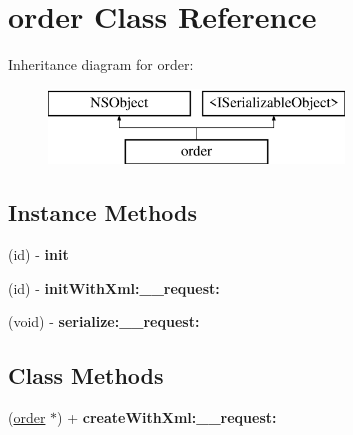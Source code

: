 \hypertarget{interfaceorder}{}\section{order Class Reference}
\label{interfaceorder}
Inheritance diagram for order\+:\begin{figure}[H]
\begin{center}
\leavevmode
\includegraphics[height=2.000000cm]{interfaceorder}
\end{center}
\end{figure}
\subsection*{Instance Methods}
\begin{DoxyCompactItemize}
\item 
\hypertarget{interfaceorder_a2e10f51ea8ce4735e209ad6be5c7b97f}{}(id) -\/ {\bfseries init}\label{interfaceorder_a2e10f51ea8ce4735e209ad6be5c7b97f}

\item 
\hypertarget{interfaceorder_a73f01f8150014cebb486df1f0345069d}{}(id) -\/ {\bfseries init\+With\+Xml\+:\+\_\+\+\_\+request\+:}\label{interfaceorder_a73f01f8150014cebb486df1f0345069d}

\item 
\hypertarget{interfaceorder_ad5021640ff09c3f7fb048353c1025c73}{}(void) -\/ {\bfseries serialize\+:\+\_\+\+\_\+request\+:}\label{interfaceorder_ad5021640ff09c3f7fb048353c1025c73}

\end{DoxyCompactItemize}
\subsection*{Class Methods}
\begin{DoxyCompactItemize}
\item 
\hypertarget{interfaceorder_ac92370e450b053fc6bc1c3d45fb7b2c6}{}(\hyperlink{interfaceorder}{order} $\ast$) + {\bfseries create\+With\+Xml\+:\+\_\+\+\_\+request\+:}\label{interfaceorder_ac92370e450b053fc6bc1c3d45fb7b2c6}

\end{DoxyCompactItemize}
